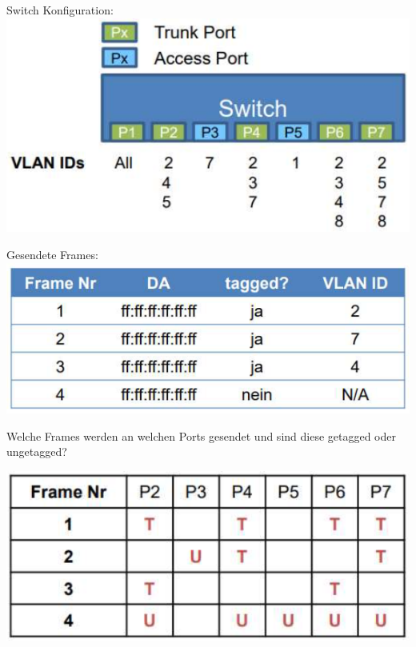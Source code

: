 \begin{example}
    \begin{minipage}{0.44\linewidth}
        Switch Konfiguration:\\
        \includegraphics[width=1\linewidth]{images/vlan_example_switch.png}
    \end{minipage}
    \begin{minipage}{0.55\linewidth}
        Gesendete Frames:\\
        \includegraphics[width=1\linewidth]{images/bsp_vlan.png}
    \end{minipage}
    
    \begin{minipage}{0.4\linewidth}
        Welche Frames werden an welchen Ports gesendet und sind diese getagged oder \\ungetagged?
    \end{minipage}
    \hspace{5mm}
    \begin{minipage}{0.5\linewidth}
        \includegraphics[width=1\linewidth]{images/vlan_example_frames.png}
    \end{minipage}    
\end{example}








